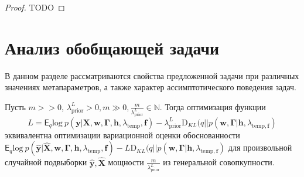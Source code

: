 \begin{proof}
TODO
\end{proof}

\section{Анализ обобщающей задачи}
В данном разделе рассматриваются свойства предложенной задачи при различных значениях метапараметров, а также характер ассимптотического поведения задач.

\begin{theorem}
Пусть $m>>0$, ${\lambda_\text{prior}^L} > 0, m \gg 0, \frac{m}{\lambda_\text{prior}^L} \in \mathbb{N}.$ Тогда оптимизация функции
\[
L = 
{\mathsf{E}_q \text{log}~{p(\mathbf{y} | \mathbf{X}, \mathbf{w}, \boldsymbol{\Gamma}, \mathbf{h}, \lambda_{\text{temp}},\mathbf{f})}}-{\lambda_\text{prior}^L\text{D}_{KL}(q||p(\mathbf{w}, \boldsymbol{\Gamma} |\mathbf{h}, \lambda_{\text{temp}, \mathbf{f}})}
\] эквивалентна оптимизации вариационной оценки обоснованности  $\mathsf{E}_q \text{log}~{p(\hat{\mathbf{y}} | \hat{\mathbf{X}}, \mathbf{w}, \boldsymbol{\Gamma}, \mathbf{h}, \lambda_{\text{temp}},\mathbf{f})}-L\text{D}_{KL}(q||p(\mathbf{w}, \boldsymbol{\Gamma} |\mathbf{h}, \lambda_{\text{temp}, \mathbf{f}})$
для произвольной случайной подвыборки $\hat{\mathbf{y}}, \hat{\mathbf{X}}$ мощности $\frac{m}{{\lambda_\text{prior}^L}}$ из генеральной совопкупности.
\end{theorem}
